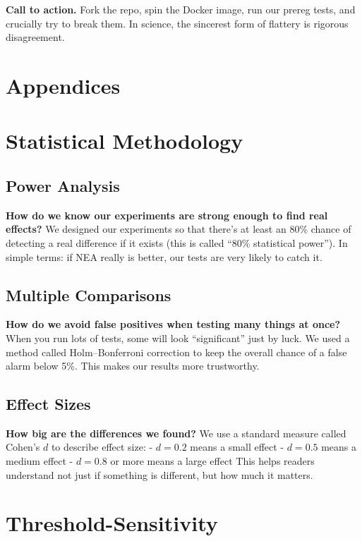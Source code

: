 \documentclass[11pt]{article}
\begin{document}
\begin{enumerate}[itemsep=1pt,label=\textbf{L\arabic*})]
\bigskip
\noindent\textbf{Call to action.}  
Fork the repo, spin the Docker image, run our prereg tests, and crucially try to break them.  
In science, the sincerest form of flattery is rigorous disagreement.
\FloatBarrier



\appendix
\section*{Appendices}

\section{Statistical Methodology}
\label{app:stats}

\subsection*{Power Analysis}
\textbf{How do we know our experiments are strong enough to find real effects?}  
We designed our experiments so that there’s at least an 80\% chance of detecting a real difference if it exists (this is called “80\% statistical power”). In simple terms: if NEA really is better, our tests are very likely to catch it.

\subsection*{Multiple Comparisons}
\textbf{How do we avoid false positives when testing many things at once?}  
When you run lots of tests, some will look “significant” just by luck. We used a method called Holm–Bonferroni correction to keep the overall chance of a false alarm below 5\%. This makes our results more trustworthy.

\subsection*{Effect Sizes}
\textbf{How big are the differences we found?}  
We use a standard measure called Cohen’s $d$ to describe effect size:  
- $d = 0.2$ means a small effect  
- $d = 0.5$ means a medium effect  
- $d = 0.8$ or more means a large effect  
This helps readers understand not just if something is different, but how much it matters.

\section{Threshold-Sensitivity}
\label{app:sensitivity}


\end{enumerate}
\end{document}
